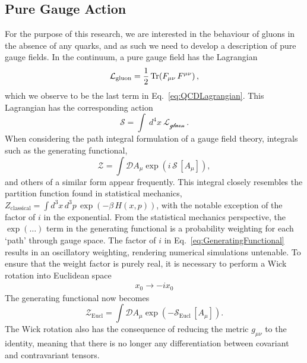 \subsection{Pure Gauge Action}
For the purpose of this research, we are interested in the behaviour of gluons in the absence of any quarks, and as such we need to develop a description of pure gauge fields. In the continuum, a pure gauge field has the Lagrangian~\cite{ryder1996quantum}
%
\begin{equation}
\mathcal{L}_{\text{gluon}}=\frac{1}{2}\operatorname{Tr}(F_{\mu\nu}\,F^{\mu\nu})\, ,
\label{eq:GaugeLagrangian}
\end{equation}
%
which we observe to be the last term in Eq.~\ref{eq:QCDLagrangian}. This Lagrangian has the corresponding action
%
\begin{equation}
\mathcal{S}=\int~d^4x~\mathcal{L_\text{gluon}}\, .
\label{eq:QCDAction}
\end{equation}
%
When considering the path integral formulation of a gauge field theory, integrals such as the generating functional,
%
\begin{equation}
\mathcal{Z} =\int \mathcal{D} A_\mu \exp\left(i\,\mathcal{S}\,[A_\mu]\right),
\label{eq:GeneratingFunctional}
\end{equation}
%
and others of a similar form appear frequently. This integral closely resembles the partition function found in statistical mechanics, $Z_{\text{classical}}=\int d^3x\,d^3p\,\exp\left(-\beta\,H(x,p)\right)$, with the notable exception of the factor of $i$ in the exponential. From the statistical mechanics perspective, the $\exp(\ldots)$ term in the generating functional is a probability weighting for each `path' through gauge space. The factor of $i$ in Eq.~\ref{eq:GeneratingFunctional} results in an oscillatory weighting, rendering numerical simulations untenable. To ensure that the weight factor is purely real, it is necessary to perform a Wick rotation into Euclidean space~\cite{Schafer:1996wv,Wilson:1974sk}
\begin{align*}
x_0\rightarrow -ix_0
\end{align*}
The generating functional now becomes 
\begin{equation}
\mathcal{Z}_{\text{Eucl}} =\int \mathcal{D} A_\mu \exp\left(-\mathcal{S}_{\text{Eucl}}\,[A_\mu]\right).
\end{equation}
The Wick rotation also has the consequence of reducing the metric $g_{\mu\nu}$ to the identity, meaning that there is no longer any differentiation between covariant and contravariant tensors.\\

